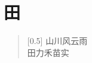 \documentclass[12pt,UTF-8,openany]{ctexbook}
\begin{document}
\hanzibox{}\hanzibox{}\hanzibox{}\hanzibox{}\hspace{1em}\hanzibox{}\hanzibox{}\hanzibox{}\hanzibox{}

\hanzibox{}\hanzibox{}\hanzibox{}\hanzibox{}\hspace{1em}\hanzibox{}\hanzibox{}\hanzibox{}\hanzibox{}

\hanzibox{}\hanzibox{}\hanzibox{}\hanzibox{}\hspace{1em}\hanzibox{}\hanzibox{}\hanzibox{}\hanzibox{}

\hanzibox{}\hanzibox{}\hanzibox{}\hanzibox{}\hspace{1em}\hanzibox{}\hanzibox{}\hanzibox{}\hanzibox{}






\chapter{田}

\begin{large}
    
    \begin{verse}[0.5\linewidth]
        山川风云雨 \\
        田力禾苗实
    \end{verse}
    
\end{large}


\clearpage

\begin{center}
    
    
    
\end{center}


\hanzibox{}\hanzibox{}\hanzibox{}\hanzibox{}\hspace{1em}\hanzibox{}\hanzibox{}\hanzibox{}\hanzibox{}

\hanzibox{}\hanzibox{}\hanzibox{}\hanzibox{}\hspace{1em}\hanzibox{}\hanzibox{}\hanzibox{}\hanzibox{}

\hanzibox{}\hanzibox{}\hanzibox{}\hanzibox{}\hspace{1em}\hanzibox{}\hanzibox{}\hanzibox{}\hanzibox{}
\end{document}
